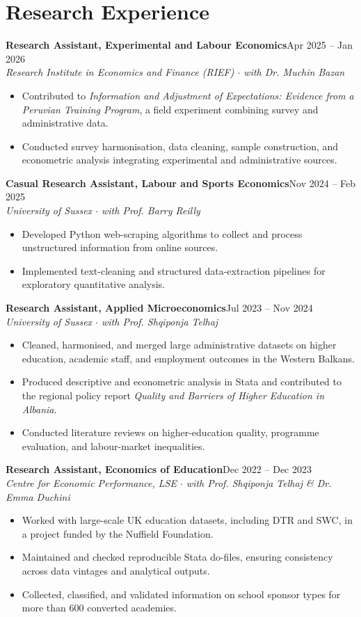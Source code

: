 \documentclass[10pt,a4paper]{article}
\newcommand{\entry}[3]{%
  \textbf{#1}\hfill{\color{muted}#2}\\
  {\small\itshape\color{muted}#3}\par\vspace{0.2ex}}
\begin{document}
\section{Research Experience}
\entry{Research Assistant, Experimental and Labour Economics}{Apr 2025 -- Jan 2026}{Research Institute in Economics and Finance (RIEF) $\cdot$ with Dr. Muchin Bazan}
\begin{itemize}
  \item Contributed to \textit{Information and Adjustment of Expectations: Evidence from a Peruvian Training Program}, a field experiment combining survey and administrative data.
  \item Conducted survey harmonisation, data cleaning, sample construction, and econometric analysis integrating experimental and administrative sources.
\end{itemize}
\vspace{0.3ex}
\entry{Casual Research Assistant, Labour and Sports Economics}{Nov 2024 -- Feb 2025}{University of Sussex $\cdot$ with Prof. Barry Reilly}
\begin{itemize}
  \item Developed Python web-scraping algorithms to collect and process unstructured information from online sources.
  \item Implemented text-cleaning and structured data-extraction pipelines for exploratory quantitative analysis.
\end{itemize}
\vspace{0.3ex}
\entry{Research Assistant, Applied Microeconomics}{Jul 2023 -- Nov 2024}{University of Sussex $\cdot$ with Prof. Shqiponja Telhaj}
\begin{itemize}
  \item Cleaned, harmonised, and merged large administrative datasets on higher education, academic staff, and employment outcomes in the Western Balkans.
  \item Produced descriptive and econometric analysis in Stata and contributed to the regional policy report \textit{Quality and Barriers of Higher Education in Albania}.
  \item Conducted literature reviews on higher-education quality, programme evaluation, and labour-market inequalities.
\end{itemize}
\vspace{0.3ex}
\entry{Research Assistant, Economics of Education}{Dec 2022 -- Dec 2023}{Centre for Economic Performance, LSE $\cdot$ with Prof. Shqiponja Telhaj \& Dr. Emma Duchini}
\begin{itemize}
  \item Worked with large-scale UK education datasets, including DTR and SWC, in a project funded by the Nuffield Foundation.
  \item Maintained and checked reproducible Stata do-files, ensuring consistency across data vintages and analytical outputs.
  \item Collected, classified, and validated information on school sponsor types for more than 600 converted academies.
\end{itemize}
\end{document}

